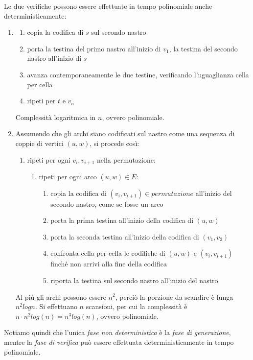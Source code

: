 Le due verifiche possono essere effettuate in tempo polinomiale anche deterministicamente:
\begin{enumerate}[label*=\arabic*.]
	\item \begin{enumerate}[label*=\arabic*.]
		\item copia la codifica di $s$ sul secondo nastro
		\item porta la testina del primo nastro all'inizio di $v_1$, la testina del secondo nastro all'inizio di $s$
		\item avanza contemporaneamente le due testine, verificando l'uguaglianza cella per cella
		\item ripeti per $t$ e $v_n$
	\end{enumerate}
	Complessità logaritmica in $n$, ovvero polinomiale.

	\item Assumendo che gli archi siano codificati sul nastro come una sequenza di coppie di vertici $(u, w)$, si procede così:
	\begin{enumerate}[label*=\arabic*.]
		\item ripeti per ogni $v_i, v_{i+1}$ nella permutazione:
		\begin{enumerate}[label*=\arabic*.]
			\item ripeti per ogni arco $(u, w) \in E$:
			\begin{enumerate}[label*=\arabic*.]
				\item copia la codifica di $(v_i, v_{i+1}) \in permutazione$ all'inizio del secondo nastro, come se fosse un arco
				\item porta la prima testina all'inizio della codifica di $(u, w)$
				\item porta la seconda testina all'inizio della codifica di $(v_1, v_2)$
				\item confronta cella per cella le codifiche di $(u, w)$ e $(v_i, v_{i+1})$ finché non arrivi alla fine della codifica
				\item riporta la testina sul secondo nastro all'inizio del nastro
			\end{enumerate}
		\end{enumerate}
	\end{enumerate}
	Al più gli archi possono essere $n^2$, perciò la porzione da scandire è lunga $n^2 log n$. Si effettuano $n$ scansioni, per cui la complessità è $n \cdot n^2log(n) = n^3 log(n)$, ovvero polinomiale.
\end{enumerate}
Notiamo quindi che l'unica \textit{fase non deterministica} è la \textit{fase di generazione}, mentre la \textit{fase di verifica} può essere effettuata deterministicamente in tempo polinomiale.

